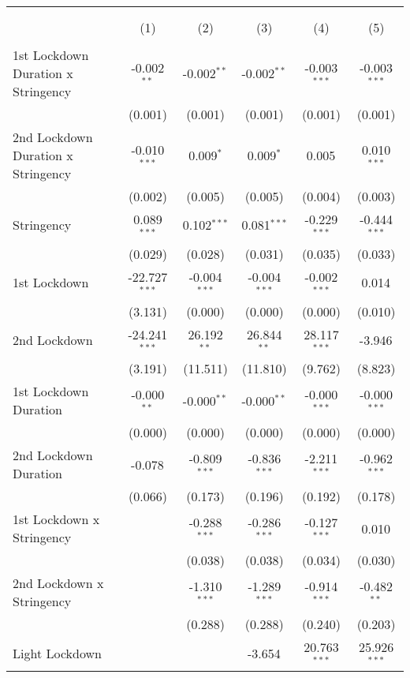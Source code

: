 \begin{tabular}{@{\extracolsep{5pt}}lccccc}
\\[-1.8ex]\hline
\hline \\[-1.8ex]
& \multicolumn{5}{c}{\textit{}} \
\cr \cline{5-6}
\\[-1.8ex] & (1) & (2) & (3) & (4) & (5) \\
\hline \\[-1.8ex]
 1st Lockdown Duration x Stringency & -0.002$^{**}$ & -0.002$^{**}$ & -0.002$^{**}$ & -0.003$^{***}$ & -0.003$^{***}$ \\
  & (0.001) & (0.001) & (0.001) & (0.001) & (0.001) \\
 2nd Lockdown Duration x Stringency & -0.010$^{***}$ & 0.009$^{*}$ & 0.009$^{*}$ & 0.005$^{}$ & 0.010$^{***}$ \\
  & (0.002) & (0.005) & (0.005) & (0.004) & (0.003) \\
 Stringency & 0.089$^{***}$ & 0.102$^{***}$ & 0.081$^{***}$ & -0.229$^{***}$ & -0.444$^{***}$ \\
  & (0.029) & (0.028) & (0.031) & (0.035) & (0.033) \\
 1st Lockdown & -22.727$^{***}$ & -0.004$^{***}$ & -0.004$^{***}$ & -0.002$^{***}$ & 0.014$^{}$ \\
  & (3.131) & (0.000) & (0.000) & (0.000) & (0.010) \\
 2nd Lockdown & -24.241$^{***}$ & 26.192$^{**}$ & 26.844$^{**}$ & 28.117$^{***}$ & -3.946$^{}$ \\
  & (3.191) & (11.511) & (11.810) & (9.762) & (8.823) \\
 1st Lockdown Duration & -0.000$^{**}$ & -0.000$^{**}$ & -0.000$^{**}$ & -0.000$^{***}$ & -0.000$^{***}$ \\
  & (0.000) & (0.000) & (0.000) & (0.000) & (0.000) \\
 2nd Lockdown Duration & -0.078$^{}$ & -0.809$^{***}$ & -0.836$^{***}$ & -2.211$^{***}$ & -0.962$^{***}$ \\
  & (0.066) & (0.173) & (0.196) & (0.192) & (0.178) \\
 1st Lockdown x Stringency & & -0.288$^{***}$ & -0.286$^{***}$ & -0.127$^{***}$ & 0.010$^{}$ \\
  & & (0.038) & (0.038) & (0.034) & (0.030) \\
 2nd Lockdown x Stringency & & -1.310$^{***}$ & -1.289$^{***}$ & -0.914$^{***}$ & -0.482$^{**}$ \\
  & & (0.288) & (0.288) & (0.240) & (0.203) \\
 Light Lockdown & & & -3.654$^{}$ & 20.763$^{***}$ & 25.926$^{***}$ \\

\end{tabular}

